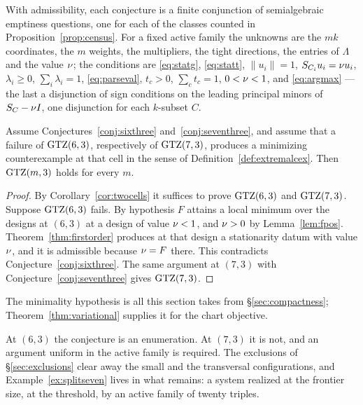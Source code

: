 With admissibility, each conjecture
is a finite conjunction of semialgebraic emptiness questions, one for
each of the classes counted in Proposition~\ref{prop:census}.  For a
fixed active family the unknowns are the $mk$ coordinates, the $m$
weights, the multipliers, the tight directions, the entries of $\Lambda$
and the value $\nu$; the conditions are \eqref{eq:statg},
\eqref{eq:statt}, $\lVert u_i\rVert=1$, $S_{C_i}u_i=\nu u_i$,
$\lambda_i\ge0$, $\sum_i\lambda_i=1$, \eqref{eq:parseval}, $t_c>0$,
$\sum_ct_c=1$, $0<\nu<1$, and \eqref{eq:argmax} --- the last a disjunction
of sign conditions on the leading principal minors of $S_{C}-\nu I$, one
disjunction for each $k$-subset $C$.

\begin{theorem}[conditional]\label{thm:rankthree}
Assume Conjectures~\ref{conj:sixthree} and~\ref{conj:seventhree}, and
assume that a failure of $\mathrm{GTZ}(6,3)$, respectively of $\mathrm{GTZ}(7,3)$,
produces a minimizing counterexample at that cell in the sense of
Definition~\ref{def:extremalcex}.  Then $\mathrm{GTZ}(m,3)$ holds for every $m$.
\end{theorem}

\begin{proof}
By Corollary~\ref{cor:twocells} it suffices to prove $\mathrm{GTZ}(6,3)$ and
$\mathrm{GTZ}(7,3)$.  Suppose $\mathrm{GTZ}(6,3)$ fails.  By hypothesis $F$ attains a
local minimum over the designs at $(6,3)$ at a design of value $\nu<1$,
and $\nu>0$ by Lemma~\ref{lem:fpos}.  Theorem~\ref{thm:firstorder}
produces at that design a stationarity datum with value $\nu$, and it is
admissible because $\nu=F$ there.  This contradicts
Conjecture~\ref{conj:sixthree}.  The same argument at $(7,3)$ with
Conjecture~\ref{conj:seventhree} gives $\mathrm{GTZ}(7,3)$.
\end{proof}

The minimality hypothesis is all this section takes from
\S\ref{sec:compactness}; Theorem~\ref{thm:variational} supplies it for
the chart objective.

At $(6,3)$ the conjecture is an enumeration.  At $(7,3)$ it is not, and
an argument uniform in the active family is required.  The exclusions of
\S\ref{sec:exclusions} clear away the small and the transversal
configurations, and Example~\ref{ex:splitseven} lives in what remains: a
system realized at the frontier size, at the threshold, by an active
family of twenty triples.

